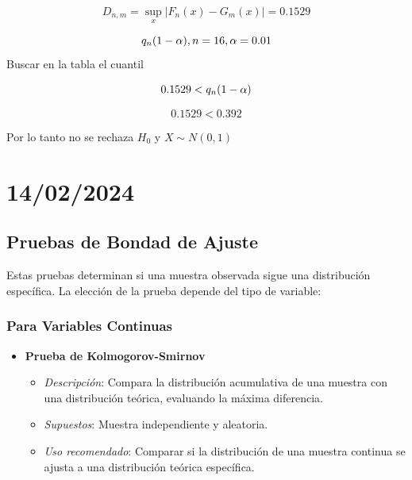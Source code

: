 \documentclass{article}
\begin{document}
\begin{equation}
    D_{n,m} = \sup_x |F_{n}(x) - G_{m}(x)| = 0.1529
\end{equation}

\begin{equation}
    q_{n}(1-\alpha), n = 16, \alpha = 0.01 \\
\end{equation}
Buscar en la tabla el cuantil

\begin{equation}
    0.1529 <  q_{n}(1-\alpha)\\
\end{equation}

\begin{equation}
    0.1529 < 0.392
\end{equation}


Por lo tanto no se rechaza $H_0$ y $X \sim N(0,1)$

\newpage

\section{14/02/2024}

\subsection{Pruebas de Bondad de Ajuste}

Estas pruebas determinan si una muestra observada sigue una distribución específica. La elección de la prueba depende del tipo de variable:

\subsubsection{Para Variables Continuas}

\begin{itemize}
    \item \textbf{Prueba de Kolmogorov-Smirnov}
          \begin{itemize}
              \item \textit{Descripción}: Compara la distribución acumulativa de una muestra con una distribución teórica, evaluando la máxima diferencia.
              \item \textit{Supuestos}: Muestra independiente y aleatoria.
              \item \textit{Uso recomendado}: Comparar si la distribución de una muestra continua se ajusta a una distribución teórica específica.
          \end{itemize}
\end{itemize}
\end{document}
